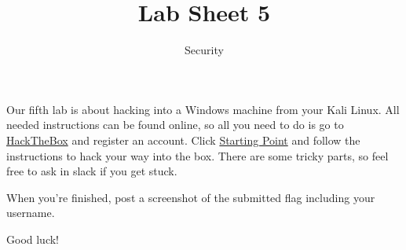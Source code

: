 \documentclass{article}
\title{Lab Sheet 5}
\date{Security}
\begin{document}
\maketitle
Our fifth lab is about hacking into a Windows machine from your Kali Linux. All needed instructions can be found online, so all you need to do is go to \href{https://www.hackthebox.eu}{HackTheBox} and register an account. Click \href{https://www.hackthebox.eu/home/start}{Starting Point} and follow the instructions to hack your way into the box. There are some tricky parts, so feel free to ask in slack if you get stuck.

When you're finished, post a screenshot of the submitted flag including your username.

Good luck!
\end{document}
